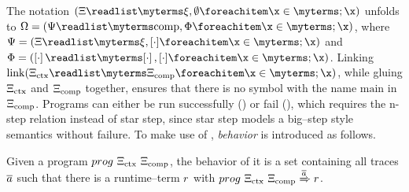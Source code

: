 \documentclass[utf8,acmsmall,review,screen,dvipsnames]{acmart}
\begin{document}
\begin{center}
\end{center}

The notation $\tup{\library}{\commlib,\emptyset}$ unfolds to $\statevar=\tup{\cfstate}{\comp,\memstate}$, where $\cfstate=\tup{\library}{\commlib,\hole{\cdot}}$ and $\memstate=\tup{\hole{\cdot}}{\hole{\cdot},\hole{\cdot}}$.
Linking $\link{\library_{\ctx}}{\library_{\comp}}$, while gluing $\Xi_{\text{ctx}}$ and $\Xi_{\text{comp}}$ together, ensures that there is no symbol with the name $\text{main}$ in $\Xi_{\text{comp}}$.
Programs can either be run successfully () or fail (), which requires the n-step relation instead of star step, since star step models a big--step style semantics without failure.
To make use of , {\em behavior} is introduced as follows.

\begin{definition}\label{def:behav}
  Given a program ${prog}\ \Xi_{\text{ctx}}\ \Xi_{\text{comp}}$, the behavior of it is a set containing all traces $\overline{a}$ such that there is a runtime--term $r$ with $\progstepto{\prog{\library_{\ctx}}{\library_{\comp}}}{\runtimetermvar}{\trace}$.
\end{definition}
\end{document}
